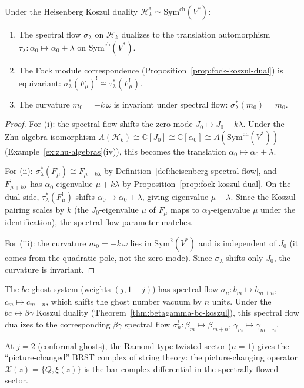 \begin{proposition}
\label{prop:spectral-flow-kd}
Under the Heisenberg Koszul duality
$\mathcal{H}_k^! \simeq \mathrm{Sym}^{\mathrm{ch}}(V^*)$:
\begin{enumerate}[label=\textup{(\roman*)}]
\item The spectral flow $\sigma_\lambda$ on $\mathcal{H}_k$
  dualizes to the translation automorphism
  $\tau_\lambda: \alpha_0 \mapsto \alpha_0 + \lambda$ on
  $\mathrm{Sym}^{\mathrm{ch}}(V^*)$.
\item The Fock module correspondence
  \textup{(}Proposition~\textup{\ref{prop:fock-koszul-dual})} is
  equivariant: $\sigma_\lambda^*(F_\mu)^! \cong
  \tau_\lambda^*(F_\mu^!)$.
\item The curvature $m_0 = -k\,\omega$ is invariant under
  spectral flow: $\sigma_\lambda^*(m_0) = m_0$.
\end{enumerate}
\end{proposition}

\begin{proof}
For (i): the spectral flow shifts the zero mode
$J_0 \mapsto J_0 + k\lambda$.  Under the Zhu algebra
isomorphism $A(\mathcal{H}_k) \cong \mathbb{C}[J_0]
\cong \mathbb{C}[\alpha_0] \cong A(\mathrm{Sym}^{\mathrm{ch}}(V^*))$
(Example~\ref{ex:zhu-algebras}(iv)), this becomes the translation
$\alpha_0 \mapsto \alpha_0 + \lambda$.

For (ii): $\sigma_\lambda^*(F_\mu) \cong F_{\mu + k\lambda}$
by Definition~\ref{def:heisenberg-spectral-flow}, and
$F_{\mu + k\lambda}^!$ has $\alpha_0$-eigenvalue
$\mu + k\lambda$ by Proposition~\ref{prop:fock-koszul-dual}.
On the dual side, $\tau_\lambda^*(F_\mu^!)$ shifts
$\alpha_0 \mapsto \alpha_0 + \lambda$, giving eigenvalue
$\mu + \lambda$.  Since the Koszul pairing scales by $k$
(the $J_0$-eigenvalue $\mu$ of $F_\mu$ maps to $\alpha_0$-eigenvalue
$\mu$ under the identification), the spectral flow parameter matches.

For (iii): the curvature $m_0 = -k\,\omega$ lies in
$\mathrm{Sym}^2(V^*)$ and is independent of $J_0$ (it comes from
the quadratic pole, not the zero mode).  Since $\sigma_\lambda$
shifts only $J_0$, the curvature is invariant.
\end{proof}

\begin{example}
\label{ex:bc-spectral-flow}
The $bc$ ghost system (weights $(j, 1-j)$) has spectral flow
$\sigma_n: b_m \mapsto b_{m+n}$, $c_m \mapsto c_{m-n}$, which shifts
the ghost number vacuum by $n$ units.  Under the
$bc \leftrightarrow \beta\gamma$ Koszul duality
(Theorem~\ref{thm:betagamma-bc-koszul}), this spectral flow dualizes
to the corresponding $\beta\gamma$ spectral flow
$\sigma_n^!: \beta_m \mapsto \beta_{m+n}$,
$\gamma_m \mapsto \gamma_{m-n}$.

At $j = 2$ (conformal ghosts), the Ramond-type twisted sector
($n = 1$) gives the ``picture-changed'' BRST complex of string
theory: the picture-changing operator $\mathcal{X}(z) = \{Q, \xi(z)\}$
is the bar complex differential in the spectrally flowed sector.
\end{example}

